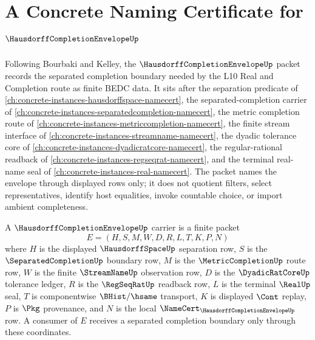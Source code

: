 \chapter{A Concrete Naming Certificate for $\HausdorffCompletionEnvelopeUp$}
\label{ch:concrete-instances-hausdorff-completion-envelope-namecert}

Following Bourbaki and Kelley, the $\HausdorffCompletionEnvelopeUp$ packet records the separated completion boundary needed by the L10 Real and Completion route as finite BEDC data. It sits after the separation predicate of \autoref{ch:concrete-instances-hausdorffspace-namecert}, the separated-completion carrier of \autoref{ch:concrete-instances-separatedcompletion-namecert}, the metric completion route of \autoref{ch:concrete-instances-metriccompletion-namecert}, the finite stream interface of \autoref{ch:concrete-instances-streamname-namecert}, the dyadic tolerance core of \autoref{ch:concrete-instances-dyadicratcore-namecert}, the regular-rational readback of \autoref{ch:concrete-instances-regseqrat-namecert}, and the terminal real-name seal of \autoref{ch:concrete-instances-real-namecert}. The packet names the envelope through displayed rows only; it does not quotient filters, select representatives, identify host equalities, invoke countable choice, or import ambient completeness.

\begin{definition}
\label{def:hausdorff-completion-envelope-carrier}
A $\HausdorffCompletionEnvelopeUp$ carrier is a finite packet
$$
E=(H,S,M,W,D,R,L,T,K,P,N)
$$
where $H$ is the displayed $\HausdorffSpaceUp$ separation row, $S$ is the $\SeparatedCompletionUp$ boundary row, $M$ is the $\MetricCompletionUp$ route row, $W$ is the finite $\StreamNameUp$ observation row, $D$ is the $\DyadicRatCoreUp$ tolerance ledger, $R$ is the $\RegSeqRatUp$ readback row, $L$ is the terminal $\RealUp$ seal, $T$ is componentwise $\BHist/\hsame$ transport, $K$ is displayed $\Cont$ replay, $P$ is $\Pkg$ provenance, and $N$ is the local $\NameCert_{\HausdorffCompletionEnvelopeUp}$ row. A consumer of $E$ receives a separated completion boundary only through these coordinates.
\end{definition}

